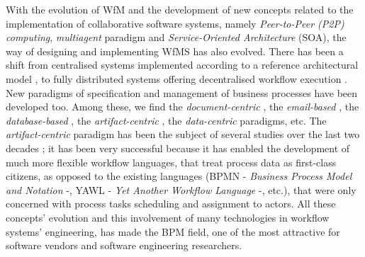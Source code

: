 With the evolution of WfM and the development of new concepts related to the implementation of collaborative software systems, namely \textit{Peer-to-Peer (P2P) computing}, \textit{multiagent} paradigm and \textit{Service-Oriented Architecture} (SOA), the way of designing and implementing WfMS has also evolved. There has been a shift from centralised systems implemented according to a reference architectural model \cite{workflowModel}, to fully distributed systems offering decentralised workflow execution \cite{meilin1998workflow, junYan06, fakas04}. New paradigms of specification and management of business processes have been developed too. Among these, we find the \textit{document-centric} \cite{krishnan2001xdoc, marchetti2005xflow, badouelTchoupeCmcs}, the \textit{email-based} \cite{burkhart2012context, gazze2012workmail}, the \textit{database-based} \cite{actionWorkflow, miao2011realization}, the \textit{artifact-centric} \cite{nigam2003business, hull2009facilitating, lohmann2010artifact}, the \textit{data-centric} \cite{damaggio2013equivalence, badouel2015active} paradigms, etc. The \textit{artifact-centric} paradigm has been the subject of several studies over the last two decades \cite{abi2016towards, deutsch2014automatic, hull2009facilitating, lohmann2010artifact, assaf2017continuous, assaf2018generating, boaz2013bizartifact, lohmann2011artifact, estanol2012artifact}; it has been very successful because it has enabled the development of much more flexible workflow languages, that treat process data as first-class citizens, as opposed to the existing languages (BPMN - \textit{Business Process Model and Notation} \cite{BPMN} -, YAWL - \textit{Yet Another Workflow Language} \cite{van1998application, van2005yawl} -, etc.), that were only concerned with process tasks scheduling and assignment to actors. All these concepts' evolution and this involvement of many technologies in workflow systems' engineering, has made the BPM field, one of the most attractive for software vendors and software engineering researchers.


